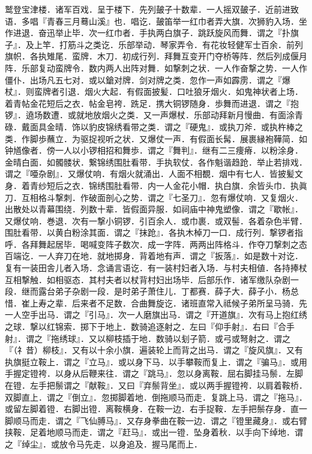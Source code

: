 \documentclass[]{article}
\begin{document}
鹫登宝津楼．诸军百戏．呈于楼下．先列皷子十数辈．一人摇双皷子．近前进致语．多唱『青春三月蓦山溪』也．唱讫．皷笛举一红巾者弄大旗．次狮豹入场．坐作进退．奋迅举止毕．次一红巾者．手执两白旗子．跳跃旋风而舞．谓之『扑旗子』．及上竿．打筋斗之类讫．乐部举动．琴家弄令．有花妆轻健军士百余．前列旗帜．各执雉尾．蛮牌．木刀．初成行列．拜舞互变开门夺桥等阵．然后列成偃月阵．乐部复动蛮牌令．数内两人出阵对舞．如撃刺之状．一人作奋撃之势．一人作僵仆．出场凡五七对．或以鎗对牌．剑对牌之类．忽作一声如霹雳．谓之『爆杖』．则蛮牌者引退．烟火大起．有假面披髪．口吐狼牙烟火．如鬼神状者上场．着青帖金花短后之衣．帖金皂袴．跣足．携大铜锣随身．歩舞而进退．谓之『抱锣』．遶场数遭．或就地放烟火之类．又一声爆杖．乐部动拜新月慢曲．有面涂青碌．戴面具金晴．饰以豹皮锦绣看带之类．谓之『硬鬼』．或执刀斧．或执杵棒之类．作脚歩蘸立．为驱捉视听之状．又爆仗一声．有假面长髯．展裹縁袍鞾简．如钟馗像者．傍一人以小锣相招和舞歩．谓之『舞判』．继有二三痩瘠．以粉涂身．金晴白面．如髑髅状．繋锦绣围肚看带．手执软仗．各作魁谐趋跄．举止若排戏．谓之『唖杂剧』．又爆仗响．有烟火就涌出．人面不相覩．烟中有七人．皆披髪文身．着青纱短后之衣．锦绣围肚看带．内一人金花小帽．执白旗．余皆头巾．执眞刀．互相格斗撃刺．作破面剖心之势．谓之『七圣刀』．忽有爆仗响．又复烟火．出散处以青幕围绕．列数十辈．皆假面异服．如祠庙中神鬼塑像．谓之『歇帐』．又爆仗响．巻退．次有一撃小铜锣．引百余人．或巾裹．或双髻．各着杂色半臂．围肚看带．以黄白粉涂其面．谓之『抹跄』．各执木棹刀一口．成行列．撃锣者指呼．各拜舞起居毕．喝喊变阵子数次．成一字阵．两两出阵格斗．作夺刀撃刺之态百端讫．一人弃刀在地．就地掷身．背着地有声．谓之『扳落』．如是数十对讫．复有一装田舎儿者入场．念诵言语讫．有一装村妇者入场．与村夫相値．各持捧杖互相撃触．如相驱态．其村夫者以杖背村妇出场毕．后部乐作．诸军缴队杂剧一段．继而露台弟子杂剧一段．是时弟子萧住儿．丁都赛．薛子大．薛子小．杨总惜．崔上寿之辈．后来者不足数．合曲舞旋讫．诸班直常入祗候子弟所呈马骑．先一人空手出马．谓之『引马』．次一人磨旗出马．谓之『开道旗』．次有马上抱红绣之球．撃以红锦索．掷下于地上．数骑追逐射之．左曰『仰手射』．右曰『合手射』．谓之『拖绣球』．又以柳枝插于地．数骑以刬子箭．或弓或弩射之．谓之『（礻昔）柳枝』．又有以十余小旗．遍装轮上而背之出马．谓之『旋风旗』．又有执旗挺立鞍上．谓之『立马』．或以身下马．以手攀鞍而复上．谓之『骗马』．或用手握定镫袴．以身从后鞭来往．谓之『跳马』．忽以身离鞍．屈右脚挂马鬃．左脚在镫．左手把鬃谓之『献鞍』．又曰『弃鬃背坐』．或以两手握镫袴．以肩着鞍桥．双脚直上．谓之『倒立』．忽掷脚着地．倒拖顺马而走．复跳上马．谓之『拖马』．或留左脚着镫．右脚出镫．离鞍横身．在鞍一边．右手捉鞍．左手把鬃存身．直一脚顺马而走．谓之『飞仙膊马』．又存身拳曲在鞍一边．谓之『镫里藏身』．或右臂挟鞍．足着地顺马而走．谓之『赶马』．或出一镫．坠身着秋．以手向下绰地．谓之『绰尘』．或放令马先走．以身追及．握马尾而上．
\end{document}
